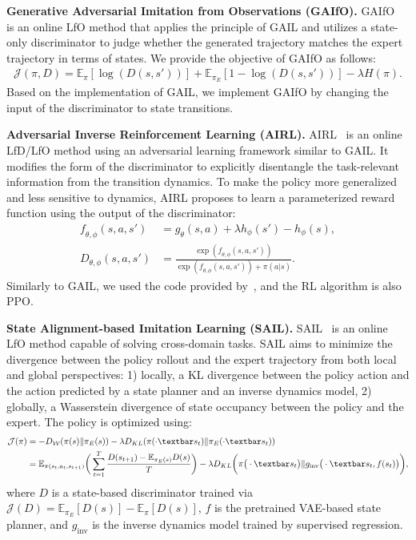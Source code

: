 \textbf{Generative Adversarial Imitation from Observations (GAIfO).} 
GAIfO~\citep{torabi2018generative} is an online LfO method that applies the principle of GAIL and utilizes a state-only discriminator to judge whether the generated trajectory matches the expert trajectory in terms of states. We provide the objective of GAIfO as follows:
\begin{align}
\mathcal{J}(\pi, D)=\mathbb{E}_{\pi}\left[{\log(D(s,s'))}\right] + \mathbb{E}_{\pi_E}\left[{1-\log(D(s,s'))}\right] - \lambda H(\pi). \nonumber 
\end{align}
Based on the implementation of GAIL, we implement GAIfO by changing the input of the discriminator to state transitions.

\textbf{Adversarial Inverse Reinforcement Learning (AIRL).} 
AIRL~\citep{fu2017learning} is an online LfD/LfO method using an adversarial learning framework similar to GAIL. It modifies the form of the discriminator to explicitly disentangle the task-relevant information from the transition dynamics. To make the policy more generalized and less sensitive to dynamics, AIRL proposes to learn a parameterized reward function using the output of the discriminator:
\begin{align}
    \textit{f}_{\theta,\phi}(s,a,s')&=g_\theta(s,a)+\lambda h_\phi(s')-h_\phi(s),  \nonumber \\
    D_{\theta,\phi}(s,a,s')&=\frac{\exp(\textit{f}_{\theta,\phi}(s,a,s'))}{\exp(\textit{f}_{\theta,\phi}(s,a,s'))+\pi(a|s)}. \nonumber
\end{align}
Similarly to GAIL, we used the code provided by~\citet{gleave2022imitation}, and the RL algorithm is also PPO. 

\textbf{State Alignment-based Imitation Learning (SAIL).} 
SAIL~\citep{liu2019state} is an online LfO method capable of solving cross-domain tasks. SAIL aims to minimize the divergence between the policy rollout and the expert trajectory from both local and global perspectives: 1) locally, a KL divergence between the policy action and the action predicted by a state planner and an inverse dynamics model, 2) globally, a Wasserstein divergence of state occupancy between the policy and the expert. 
The policy is optimized using:
\begin{align}
    \mathcal{J}(\pi)&=-D_{\mathcal{W}}(\pi(s) \Vert \pi_E(s)) - \lambda D_{KL}(\pi(\cdot \textbar s_t) \Vert \pi_E(\cdot \textbar s_t)) \nonumber\\
    &=\mathbb{E}_{\pi(s_t,a_t,s_{t+1})} \bigg(\sum_{t=1}^{T}\frac{D(s_{t+1})- \mathbb{E}_{\pi_E(s)}D(s)}{T}\bigg) - 
\lambda D_{KL} \bigg(\pi\big(\cdot \textbar s_t\big) \Vert g_{\text{inv}}\big( \cdot \textbar s_t, f(s_t)\big)  \bigg), \nonumber 
\end{align}
where $D$ is a state-based discriminator trained via $\mathcal{J}(D)=\mathbb{E}_{\pi_E}\left[D(s)\right] - \mathbb{E}_{\pi}\left[D(s)\right]$, $f$ is the pretrained VAE-based state planner, and $g_{\text{inv}}$ is the inverse dynamics model trained by supervised regression.
    
